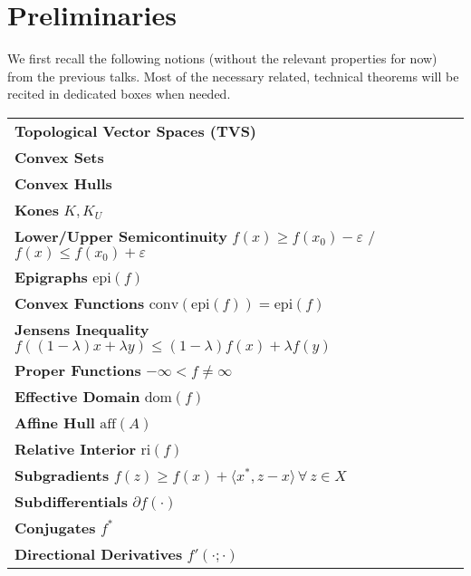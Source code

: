 \documentclass[10pt, leqno]{amsart}
\theoremstyle{definition}
\theoremstyle{remark}
\newcommand{\draftcommentdone}{}
\begin{document}
    \section{Preliminaries \draftcommentdone} \label{preliminaries} We first recall the following notions (without the relevant properties for now) from the previous talks. Most of the necessary related, technical theorems will be recited in dedicated boxes when needed.
    \begin{table}[!hbtp]
        \centering
        \begin{tabular}{l|l}
            \textbf{Topological Vector Spaces (TVS)} & \cite[pp. 30-31]{Jaenich}\\
            \textbf{Convex Sets}               & \cite[p. 45]{IoffeTihomirov}\\
            \textbf{Convex Hulls}              & \cite[p. 162]{IoffeTihomirov}\\
            \textbf{Kones} \(K, K_U\)          & \cite[p. 45, p. 162]{IoffeTihomirov}\\
            \textbf{Lower/Upper Semicontinuity} \(f(x) \geq f(x_0) - \varepsilon\) / \(f(x) \leq f(x_0) + \varepsilon\) & \cite[p. 12]{IoffeTihomirov}\\
            \textbf{Epigraphs} \(\text{epi}(f)\) & \cite[p. 45]{IoffeTihomirov}\\
            \textbf{Convex Functions} \(\text{conv}(\text{epi}(f))=\text{epi}(f)\) & \cite[p. 45]{IoffeTihomirov}\\
            \textbf{Jensens Inequality} \(f((1-\lambda)x+\lambda y) \leq (1-\lambda)f(x)+\lambda f(y)\)        & \cite[p. 167]{IoffeTihomirov}\\
            \textbf{Proper Functions} \(-\infty < f \neq \infty\) & \cite[p. 45]{IoffeTihomirov}\\
            \textbf{Effective Domain} \(\text{dom}(f)\) & \cite[p. 45]{IoffeTihomirov}\\
            \textbf{Affine Hull} \(\text{aff}(A)\) & \cite[p. 186]{IoffeTihomirov}\\
            \textbf{Relative Interior} \(\text{ri}(f)\) & \cite[p. 187]{IoffeTihomirov}\\
            \textbf{Subgradients} \(f(z) \geq f(x) + \langle x^*, z-x\rangle \, \forall \, z \in X\) & \cite[p. 46]{IoffeTihomirov}\\
            \textbf{Subdifferentials} \(\partial f(\cdot)\) & \cite[p. 46]{IoffeTihomirov}\\
            \textbf{Conjugates} \(f^*\)        & \cite[pp. 171-172]{IoffeTihomirov}\\
            \textbf{Directional Derivatives} \(f'(\cdot; \cdot)\) & \cite[p. 193]{IoffeTihomirov}
        \end{tabular}
    \end{table}
\end{document}
